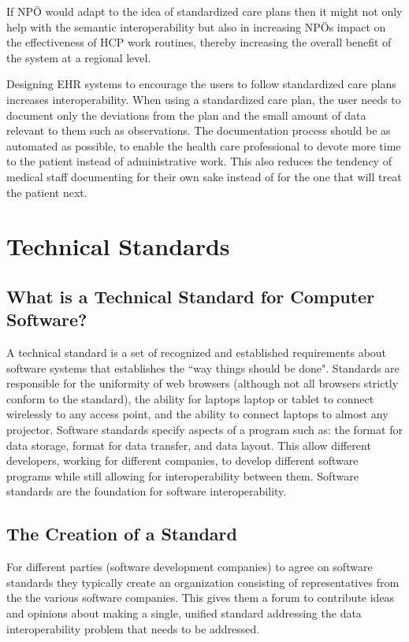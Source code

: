 \documentclass[14pt]{article}
\begin{document}
If NPÖ would adapt to the idea of standardized care plans then it might not only help with the semantic interoperability but also in increasing NPÖs impact on the effectiveness of HCP work routines, thereby increasing the overall benefit of the system at a regional level. \cite{Cambio}

Designing EHR systems to encourage the users to follow standardized care plans increases interoperability. When using a standardized care plan, the user needs to document only the deviations from the plan and the small amount of data relevant to them such as observations. The documentation process should be as automated as possible, to enable the health care professional to devote more time to the patient instead of administrative work. This also reduces the tendency of medical staff documenting for their own sake instead of for the one that will treat the patient next. \cite{Cambio}

\newpage

\section{Technical Standards}
\label{sec:TechnicalStandards}

\subsection{What is a Technical Standard for Computer Software?}
A technical standard is a set of recognized and established requirements about software systems that establishes the ``way things should be done". Standards are responsible for the uniformity of web browsers (although not all browsers strictly conform to the standard), the ability for laptops laptop or tablet to connect wirelessly to any access point, and the ability to connect laptops to almost any projector. Software standards specify aspects of a program such as: the format for data storage, format for data transfer, and data layout. This allow different developers, working for different companies, to develop different software programs while still allowing for \gls{interoperability} between them. Software standards are the foundation for software \gls{interoperability}.

\subsection{The Creation of a Standard}
For different parties (software development companies) to agree on software standards they typically create an organization consisting of representatives from the the various software companies. This gives them a forum to contribute ideas and opinions about making a single, unified standard addressing the data \gls{interoperability} problem that needs to be addressed.
\end{document}
